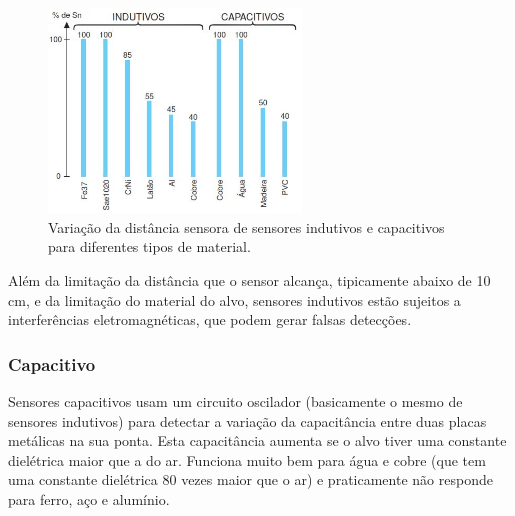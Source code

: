 \begin{figure}
  \centering
  \includegraphics[width=0.6\textwidth]{figuras/distancia_sensora}
  \caption{Variação da distância sensora de sensores indutivos e capacitivos para diferentes tipos de material.}\label{fig:distancia_sensora}
\end{figure}

Além da limitação da distância que o sensor alcança, tipicamente abaixo de 10 cm, e da limitação do material do alvo, sensores indutivos estão sujeitos a interferências eletromagnéticas, que podem gerar falsas detecções.

\subsubsection{Capacitivo}
\label{subs:Capacitivo}

Sensores capacitivos usam um circuito oscilador (basicamente o mesmo de sensores indutivos) para detectar a variação da capacitância entre duas placas metálicas na sua ponta. Esta capacitância aumenta se o alvo tiver uma constante dielétrica maior que a do ar. Funciona muito bem para água e cobre (que tem uma constante dielétrica 80 vezes maior que o ar) e praticamente não responde para ferro, aço e alumínio.


